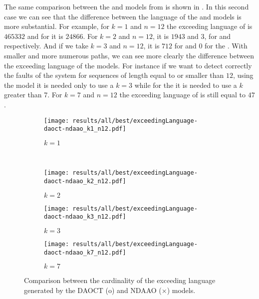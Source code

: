 The same comparison between the \DAOCT{} and \NDAAO{} models from
 is shown in .
In this second case we can see that the difference between the language of the \DAOCT{} and
\NDAAO{} models is more substantial. For example, for $k=1$ and $n=12$ the
exceeding language of \NDAAO{} is $465332$ and for \DAOCT{} it is $24866$. For
$k=2$ and $n=12$, it is $1943$ and $3$, for \NDAAO{} and \DAOCT{} respectively. And
if we take $k=3$ and $n=12$, it is $712$ for \NDAAO{} and $0$ for the \DAOCT{}. With
smaller and more numerous paths, we can see more clearly the difference between the
exceeding language of the models. For instance if we want to detect correctly
the faults of the system for sequences of length equal to or smaller
than $12$, using the \DAOCT{} model it is needed only to use a $k=3$ while for the
\NDAAO{} it is needed to use a $k$ greater than 7. For $k=7$ and $n=12$ the
exceeding language of \NDAAO{} is still equal to $47$. 
\begin{figure}[H]
  \begin{subfigure}[H]{0.5\textwidth}
    \centering
    \texttt{[image: results/all/best/exceedingLanguage-daoct-ndaao\_k1\_n12.pdf]}
    \caption{$k=1$}
    \label{fig:daoctNdaaoBestkone}
  \end{subfigure}
  ~
  \begin{subfigure}[h]{0.5\textwidth}
    \centering
    \texttt{[image: results/all/best/exceedingLanguage-daoct-ndaao\_k2\_n12.pdf]}
    \caption{$k=2$}
    \label{fig:daoctNdaaoBestktwo}
  \end{subfigure}
  \begin{subfigure}[h]{0.5\textwidth}
    \centering
    \texttt{[image: results/all/best/exceedingLanguage-daoct-ndaao\_k3\_n12.pdf]}
    \caption{$k=3$}
    \label{fig:daoctNdaaoBestkthree}
  \end{subfigure}
  \begin{subfigure}[h]{0.5\textwidth}
    \centering
    \texttt{[image: results/all/best/exceedingLanguage-daoct-ndaao\_k7\_n12.pdf]}
    \caption{$k=7$}
    \label{fig:daoctNdaaoBestkseven}
  \end{subfigure}
  \caption[Comparison between the cardinality of the exceeding language generated by the DAOCT and
NDAAO.]{Comparison between the cardinality of the exceeding language generated by the DAOCT (o) and
NDAAO ($\times$) models.}
\end{figure}
